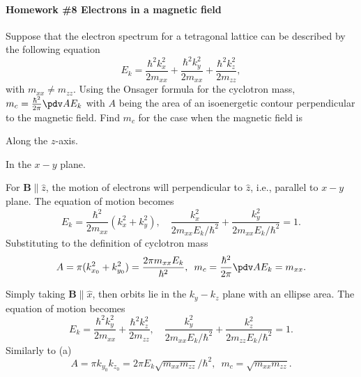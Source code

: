 
\paragraph{Homework \#8 Electrons in a magnetic field}

\begin{problem}
  Suppose that the electron spectrum for a tetragonal lattice can be described
  by the following equation
  \[
    E_k = \frac{\hbar^2 k_x^2}{2m_{xx}} + \frac{\hbar^2 k_y^2}{2m_{xx}}
        + \frac{\hbar^2 k_z^2}{2m_{zz}},
  \]
  with $m_{xx} \neq m_{zz}$. Using the Onsager formula for the cyclotron mass,
  $m_c = \frac{\hbar^2}{2\pi} \pdv A{E_k}$ with $A$ being the area of an
  isoenergetic contour perpendicular to the magnetic field. Find $m_c$ for the
  case when the magnetic field is
  \begin{enumext}[columns = 2]
    \item Along the $z$-axis.
    \item In the $x-y$ plane.
  \end{enumext}
\end{problem}
\begin{solution}\leavevmode
  \begin{enumext}
    \item For $\bm B \parallel \hat z$, the motion of electrons will
    perpendicular to $\hat z$, i.e., parallel to $x-y$ plane. The equation of
    motion becomes
    \[
      E_k = \frac{\hbar^2}{2m_{xx}}(k_x^2 + k_y^2), \quad
      \frac{k_x^2}{2m_{xx}E_k/\hbar^2} + \frac{k_y^2}{2m_{xx}E_k/\hbar^2} = 1.
    \]
    Substituting to the definition of cyclotron mass
    \[
      A = \pi (k_{x_0}^2 + k_{y_0}^2) = \frac{2\pi m_{xx} E_k}{\hbar^2},
      \enspace
      m_c = \frac{\hbar^2}{2\pi} \pdv A{E_k} = m_{xx}.
    \]
    \item Simply taking $\bm B \parallel \hat x$, then orbits lie in the
    $k_y-k_z$ plane with an ellipse area. The equation of motion becomes
    \[
      E_k = \frac{\hbar^2 k_y^2}{2m_{xx}} + \frac{\hbar^2 k_z^2}{2m_{zz}},\quad
      \frac{k_y^2}{2m_{xx}E_k/\hbar^2} + \frac{k_z^2}{2m_{zz}E_k/\hbar^2} = 1.
    \]
    Similarly to (a)
    \[
      A = \pi k_{y_0} k_{z_0} = 2\pi E_k\sqrt{m_{xx}m_{zz}}/\hbar^2,
      \enspace
      m_c = \sqrt{m_{xx}m_{zz}}.
    \]
  \end{enumext}
\end{solution}

